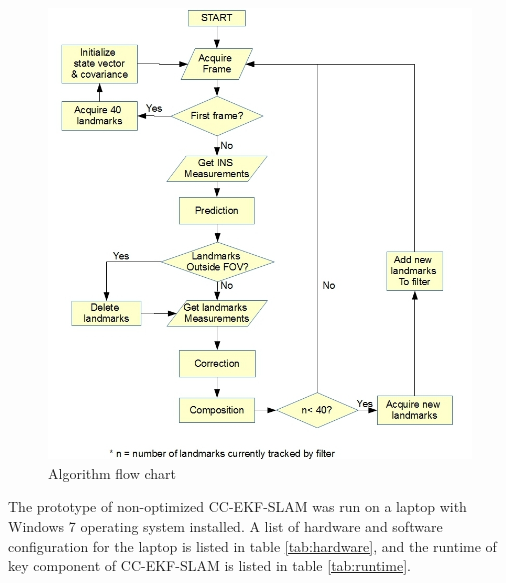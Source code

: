 \begin{figure}[h]
\centering
\includegraphics[width=14cm, keepaspectratio=true]{./Figures/flow_chart.jpg}
\caption{Algorithm flow chart}
\label{fig:flowchart}
\end{figure}
\FloatBarrier

The prototype of non-optimized CC-EKF-SLAM was run on a laptop with
Windows 7 operating system installed. A list of hardware and software
configuration for the laptop is listed in table \ref{tab:hardware},
and the runtime of key component of CC-EKF-SLAM is listed in table
\ref{tab:runtime}. 

